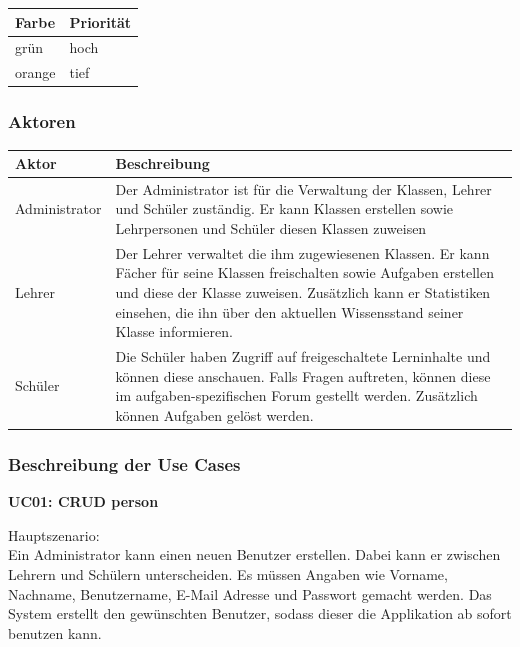 \begin{tabular}{| p{1cm} | p{1.3cm}|}
	\hline
	\textbf{Farbe} & \textbf{Priorität} \\
	\hline	
	grün & hoch \\
	\hline
	orange & tief \\
	\hline
\end{tabular}


\subsubsection{Aktoren}

\begin{table}[h]
	\centering
	\begin{tabu} to 0.9\textwidth {l X}
	\toprule
	Aktor & Beschreibung \\ 
	\midrule
	Administrator & Der Administrator ist für die Verwaltung der Klassen, Lehrer und Schüler zuständig. Er kann Klassen erstellen sowie Lehrpersonen und Schüler diesen Klassen zuweisen \\
	\midrule
		Lehrer & Der Lehrer verwaltet die ihm zugewiesenen Klassen. Er kann Fächer für seine Klassen freischalten sowie Aufgaben erstellen und diese der Klasse zuweisen. Zusätzlich kann er Statistiken einsehen, die ihn über den aktuellen Wissensstand seiner Klasse informieren. \\
	\midrule
		Schüler & Die Schüler haben Zugriff auf freigeschaltete Lerninhalte und können diese anschauen. Falls Fragen auftreten, können diese im aufgaben-spezifischen Forum gestellt werden. Zusätzlich können Aufgaben gelöst werden. \\
	\bottomrule
	\end{tabu}
\end{table}


\subsubsection{Beschreibung der Use Cases}
\textbf{UC01: CRUD person}

\noindent Hauptszenario: \\
Ein Administrator kann einen neuen Benutzer erstellen. Dabei kann er zwischen Lehrern und Schülern unterscheiden. Es müssen Angaben wie Vorname, Nachname, Benutzername, E-Mail Adresse und Passwort gemacht werden. Das System erstellt den gewünschten Benutzer, sodass dieser die Applikation ab sofort benutzen kann. \\

